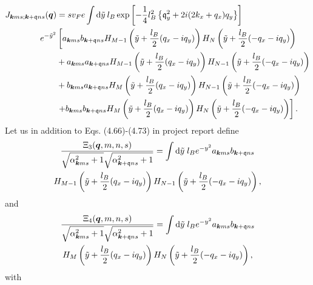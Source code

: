 \begin{equation}
  \label{eq:28}
  \begin{split}
    J_{\bm{k}ms; \bm{k}+\mathfrak{q} ns}(\bm{q}) &=
    s v_F e \int \mathrm{d}\tilde{y} \: l_B
\exp \left[- \frac{1}{4} l_B^2 \left\{
    \mathfrak{q}_y^2 + 2 i (2k_x + q_x) q_y
    \right\}\right]\\
  e^{-\tilde{y}^2}
   &\left[
    a_{\bm{k}ms}b_{\bm{k} + \mathfrak{q} ns}
    H_{M-1} \left( \tilde{y} + \frac{l_B}{2}(q_x - iq_y) \right)
    H_N\left( \tilde{y} + \frac{l_B}{2}(-q_x - iq_y) \right) \right.\\
    &+ a_{\bm{k}ms}a_{\bm{k} + \mathfrak{q} ns}
    H_{M-1} \left( \tilde{y} + \frac{l_B}{2}(q_x - iq_y) \right)
    H_{N-1}\left( \tilde{y} + \frac{l_B}{2}(-q_x - iq_y) \right)\\
   & +
    b_{\bm{k}ms} a_{\bm{k} + \mathfrak{q} ns}
    H_M \left( \tilde{y} + \frac{l_B}{2}(q_x - iq_y) \right)
    H_{N-1} \left( \tilde{y} +  \frac{l_B}{2}(-q_x - iq_y)\right)\\
    &\left. +
    b_{\bm{k}ms} b_{\bm{k} + \mathfrak{q} ns}
    H_M \left( \tilde{y} + \frac{l_B}{2}(q_x - iq_y) \right)
    H_{N} \left( \tilde{y} +  \frac{l_B}{2}(-q_x - iq_y)\right)
    \right].
  \end{split}
\end{equation}
Let us in addition to Eqs. (4.66)-(4.73) in project report define
\begin{multline}
  \label{eq:30}
  \frac{\Xi _3(\vec{q}, m, n, s)}{
    \sqrt{\alpha _{\vec{k} \vphantom{\qvec{q}} ms}^2 +1}
    \sqrt{\alpha _{\vec{k}+\qvec{q} ns}^2 + 1}
  }
  =
  \int \mathrm{d}\tilde{y} \; l_B e^{-y^2}
  a_{\vec{k}ms}b_{\vec{k} + \qvec{q} ns}\\
  H_{M-1} \left( \tilde{y} + \frac{l_B}{2}(q_x - iq_y) \right)
  H_{N-1}\left( \tilde{y} + \frac{l_B}{2}(-q_x - iq_y) \right)
  ,
\end{multline}
and
\begin{multline}
  \label{eq:31}
  \frac{\Xi _4(\vec{q}, m, n, s)}{
    \sqrt{\alpha _{\vec{k} \vphantom{\qvec{q}} ms}^2 +1}
    \sqrt{\alpha _{\vec{k}+\qvec{q} ns}^2 + 1}
  }
  =
  \int \mathrm{d}\tilde{y} \; l_B e^{-y^2}
  a_{\vec{k}ms}b_{\vec{k} + \qvec{q} ns}\\
  H_{M} \left( \tilde{y} + \frac{l_B}{2}(q_x - iq_y) \right)
  H_{N}\left( \tilde{y} + \frac{l_B}{2}(-q_x - iq_y) \right)
  ,
\end{multline}
with
